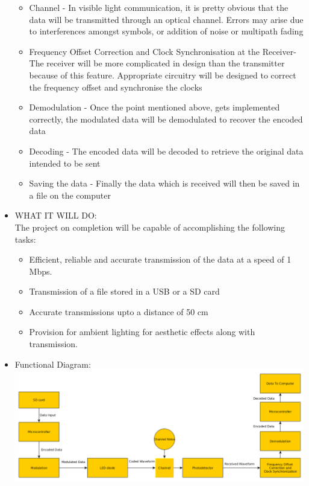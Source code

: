 \documentclass{article}
\begin{document}
\begin{itemize}
\begin{itemize}
  \item Channel - In visible light communication, it is pretty obvious that the data will be transmitted through an optical channel. Errors may arise due to interferences amongst symbols, or addition of noise or multipath fading
  \item Frequency Offset Correction and Clock Synchronisation at the Receiver- The receiver will be more complicated in design than the transmitter because of this feature. Appropriate circuitry will be designed to correct the frequency offset and synchronise the clocks
  \item Demodulation - Once the point mentioned above, gets implemented correctly, the modulated data will be demodulated to recover the encoded data
  \item Decoding - The encoded data will be decoded to retrieve the original data intended to be sent
  \item Saving the data - Finally the data which is received will then be saved in a file on the computer
  \end{itemize}
\item WHAT IT WILL DO:\\
  The project on completion will be capable of accomplishing the following tasks:
  \begin{itemize}
  \item Efficient, reliable and accurate transmission of the data at a speed of 1 Mbps.
  \item Transmission of a file stored in a USB or a SD card
  \item Accurate transmissions upto a distance of 50 cm
  \item Provision for ambient lighting for aesthetic effects along with transmission.  
  \end{itemize}
\item Functional Diagram:\\
  \includegraphics[scale=0.4]{functional_flow}
  
\end{itemize}
\end{document}
